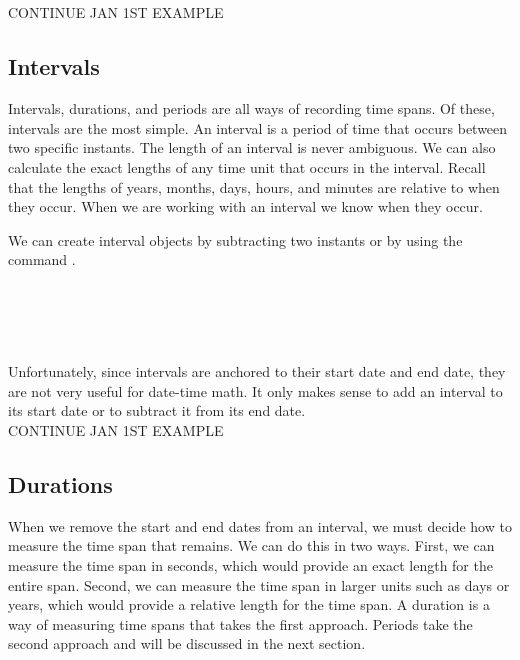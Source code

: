 \documentclass[article]{jss}
\begin{document}
\\
\\
\\
\\

CONTINUE JAN 1ST EXAMPLE



\subsection{Intervals}
\label{sec:intervals}

Intervals, durations, and periods are all ways of recording time spans. Of these, intervals are the most simple. An interval is a period of time that occurs between two specific instants. The length of an interval is never ambiguous. We can also calculate the exact lengths of any time unit that occurs in the interval. Recall that the lengths of years, months, days, hours, and minutes are relative to when they occur. When we are working with an interval we know when they occur. 

We can create interval objects by subtracting two instants or by using the command .

\\
\\

\\
\\

Unfortunately, since intervals are anchored to their start date and end date, they are not very useful for date-time math. It only makes sense to add an interval to its start date or to subtract it from its end date.\\


CONTINUE JAN 1ST EXAMPLE

\subsection{Durations}
\label{sec:durations}

When we remove the start and end dates from an interval, we must decide how to measure the time span that remains. We can do this in two ways. First, we can measure the time span in seconds, which would provide an exact length for the entire span. Second, we can measure the time span in larger units such as days or years, which would provide a relative length for the time span. A duration is a way of measuring time spans that takes the first approach. Periods take the second approach and will be discussed in the next section.
\end{document}
